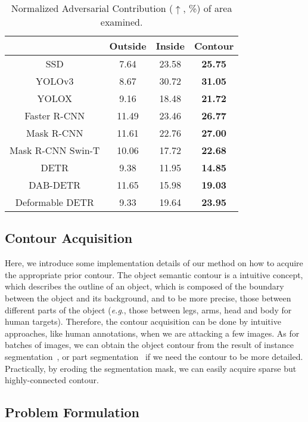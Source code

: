 \documentclass[times,twocolumn,final,authoryear]{elsarticle}
\def\onedot{.\null\xspace}
\def\eg{\emph{e.g}\onedot} \def\Eg{\emph{E.g}\onedot}
\begin{document}
\begin{table}[!h]
\centering
\caption{Normalized Adversarial Contribution ($\uparrow$, \%) of area examined.}
\begin{tabular}{c|c|c|c}
\hline
    & Outside&  Inside & Contour   \\ \hline
SSD    
&   7.64  & 23.58    &   \bf{25.75}  \\ 
YOLOv3          
 &   8.67  &   30.72  &  \bf{31.05} \\ 
YOLOX 
&   9.16  & 18.48    &    \bf{21.72}  \\ 
Faster R-CNN    
 &   11.49  & 23.46    &   \bf{26.77} \\
Mask R-CNN    
 &   11.61  & 22.76    &   \bf{27.00}  \\ 
Mask R-CNN Swin-T   
 &   10.06  & 17.72    &  \bf{22.68} \\ 
DETR 
&   9.38  &  11.95   & \bf{14.85}    \\ 
DAB-DETR 
&   11.65  &  15.98   &  \bf{19.03}  \\
Deformable DETR 
 &   9.33  & 19.64    &  \bf{23.95}  \\ 
 \hline
\end{tabular}
\label{tab:nac}
\end{table}


\subsection{Contour Acquisition}
\label{sec:implementation}

Here, we introduce some implementation details of our method on how to acquire the appropriate prior contour. The object semantic contour is a intuitive concept, which describes the outline of an object, which is composed of the boundary between the object and its background, and to be more precise, those between different parts of the object (\eg, those between legs, arms, head and body for human targets). Therefore, the contour acquisition can be done by intuitive approaches, like human annotations, when we are attacking a few images. As for batches of images, we can obtain the object contour from the result of instance segmentation~\citep{he2017mask}, or part segmentation~\citep{lin2020cross} if we need the contour to be more detailed. Practically, by eroding the segmentation mask, we can easily acquire sparse but highly-connected contour.


\subsection{Problem Formulation}
\label{sec:formulation}
\end{document}
